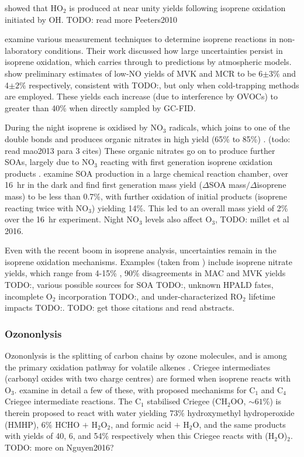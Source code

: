     \cite{Peeters2010} showed that HO$_2$ is produced at near unity yields following isoprene oxidation initiated by OH.
    TODO: read more Peeters2010
    
    \cite{Nguyen2014} examine various measurement techniques to determine isoprene reactions in non-laboratory conditions.
    Their work discussed how large uncertainties persist in isoprene oxidation, which carries through to predictions by atmospheric models.
    \cite{Nguyen2014} show preliminary estimates of low-NO yields of MVK and MCR to be 6$\pm3\%$ and 4$\pm2\%$ respectively, consistent with TODO:\cite{Liu2013}, but only when cold-trapping methods are employed.
    These yields each increase (due to interference by OVOCs) to greater than 40\% when directly sampled by GC-FID.
    
    During the night isoprene is oxidised by NO$_3$ radicals, which joins to one of the double bonds and produces organic nitrates in high yield (65\% to 85\%) \citep{Mao2013}. (todo: read mao2013 para 3 cites)
    These organic nitrates go on to produce further SOAs, largely due to NO$_3$ reacting with first generation isoprene oxidation products \citep{Rollins2009}.
    \cite{Rollins2009} examine SOA production in a large chemical reaction chamber, over 16~hr in the dark and find first generation mass yield ($\Delta$SOA mass$/\Delta$isoprene mass) to be less than 0.7\%, with further oxidation of initial products (isoprene reacting twice with NO$_3$) yielding 14\%.
    This led to an overall mass yield of 2\% over the 16~hr experiment.
    Night NO$_3$ levels also affect O$_3$, TODO: millet et al 2016. %
    
    Even with the recent boom in isoprene analysis, uncertainties remain in the isoprene oxidation mechanisms.
    Examples (taken from \cite{Nguyen2014}) include isoprene nitrate yields, which range from 4-15\% \citep{Paulot2009a}, 90\% disagreements in MAC and MVK yields TODO:\citep{Liu2013}, various possible sources for SOA TODO:\citep{Chan2010, Surratt2010, Lin2013}, unknown HPALD fates, incomplete O$_2$ incorporation TODO:\citep{Peeters2009,Crounse2013}, and under-characterized RO$_2$ lifetime impacts TODO:\citep{Wolfe2012}. TODO: get those citations and read abstracts.
    
    \subsubsection{Ozononlysis}
    Ozononlysis is the splitting of carbon chains by ozone molecules, and is among the primary oxidation pathway for volatile alkenes \citep{Nguyen2016}.
    Criegee intermediates (carbonyl oxides with two charge centres) are formed when isoprene reacts with O$_3$. 
    \cite{Nguyen2016} examine in detail a few of these, with proposed mechanisms for C$_1$ and C$_4$ Criegee intermediate reactions.
    The C$_1$ stabilised Criegee (CH$_2$OO, $\sim 61\%$) is therein proposed to react with water yielding $73\%$ hydroxymethyl hydroperoxide (HMHP), $6\%$ HCHO $+$ H$_2$O$_2$, and formic acid $+$ H$_2$O, and the same products with yields of 40, 6, and 54$\%$ respectively when this Criegee reacts with (H$_2$O)$_2$.
    TODO: more on Nguyen2016?
    
